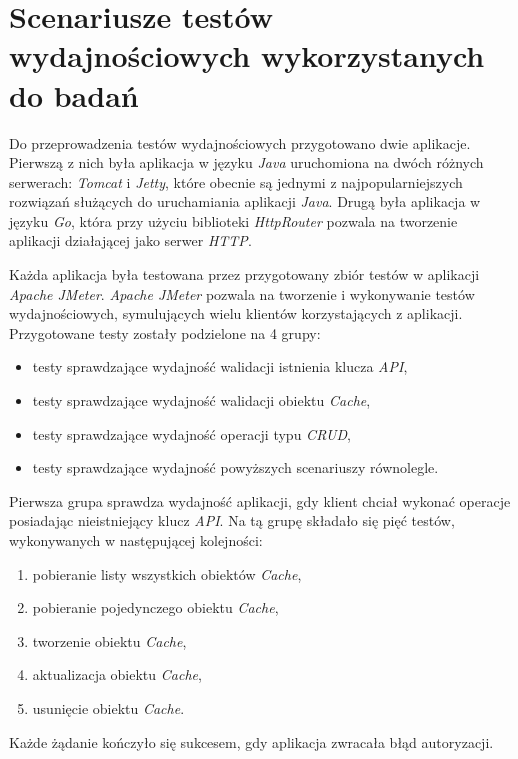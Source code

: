 \section{Scenariusze testów wydajnościowych wykorzystanych do badań}

Do przeprowadzenia testów wydajnościowych przygotowano dwie aplikacje. Pierwszą z nich była aplikacja w języku \textsl{Java} uruchomiona na dwóch różnych serwerach: \textsl{Tomcat} i \textsl{Jetty}, które obecnie są jednymi z najpopularniejszych rozwiązań służących do uruchamiania aplikacji \textsl{Java}. Drugą była aplikacja w języku \textsl{Go}, która przy użyciu biblioteki \textsl{HttpRouter} \cite{httprouter} pozwala na tworzenie aplikacji działającej jako serwer \textsl{HTTP}.

Każda aplikacja była testowana przez przygotowany zbiór testów w aplikacji \textsl{Apache JMeter}. \textsl{Apache JMeter} pozwala na tworzenie i wykonywanie testów wydajnościowych, symulujących wielu klientów korzystających z aplikacji. Przygotowane testy zostały podzielone na 4 grupy:
\begin{itemize}
    \item testy sprawdzające wydajność walidacji istnienia klucza \textsl{API},
    \item testy sprawdzające wydajność walidacji obiektu \textsl{Cache},
    \item testy sprawdzające wydajność operacji typu \textsl{CRUD},
    \item testy sprawdzające wydajność powyższych scenariuszy równolegle.
\end{itemize}

Pierwsza grupa sprawdza wydajność aplikacji, gdy klient chciał wykonać operacje posiadając nieistniejący klucz \textsl{API}. Na tą grupę składało się pięć testów, wykonywanych w następującej kolejności:
\begin{enumerate}
    \item pobieranie listy wszystkich obiektów \textsl{Cache},
    \item pobieranie pojedynczego obiektu \textsl{Cache},
    \item tworzenie obiektu \textsl{Cache},
    \item aktualizacja obiektu \textsl{Cache}, 
    \item usunięcie obiektu \textsl{Cache}.
\end{enumerate}
Każde żądanie kończyło się sukcesem, gdy aplikacja zwracała błąd autoryzacji.

